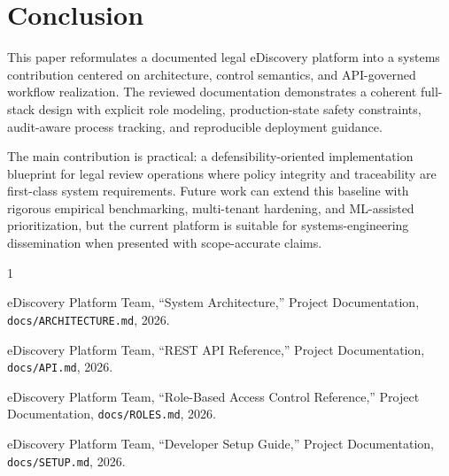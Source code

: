 \documentclass[conference]{IEEEtran}
\begin{document}
\section{Conclusion}
This paper reformulates a documented legal eDiscovery platform into a systems contribution centered on architecture, control semantics, and API-governed workflow realization. The reviewed documentation demonstrates a coherent full-stack design with explicit role modeling, production-state safety constraints, audit-aware process tracking, and reproducible deployment guidance.

The main contribution is practical: a defensibility-oriented implementation blueprint for legal review operations where policy integrity and traceability are first-class system requirements. Future work can extend this baseline with rigorous empirical benchmarking, multi-tenant hardening, and ML-assisted prioritization, but the current platform is suitable for systems-engineering dissemination when presented with scope-accurate claims.

\begin{thebibliography}{1}

eDiscovery Platform Team, ``System Architecture,'' Project Documentation, \texttt{docs/ARCHITECTURE.md}, 2026.

eDiscovery Platform Team, ``REST API Reference,'' Project Documentation, \texttt{docs/API.md}, 2026.

eDiscovery Platform Team, ``Role-Based Access Control Reference,'' Project Documentation, \texttt{docs/ROLES.md}, 2026.

eDiscovery Platform Team, ``Developer Setup Guide,'' Project Documentation, \texttt{docs/SETUP.md}, 2026.

\end{thebibliography}
\end{document}
